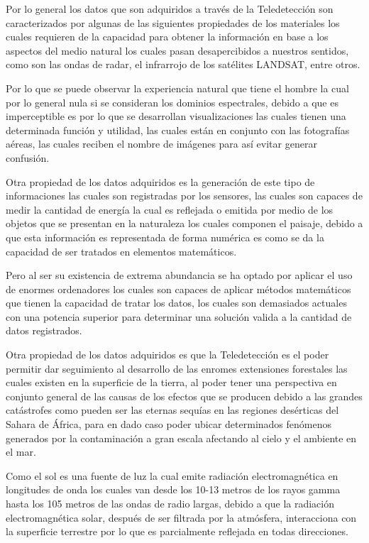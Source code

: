 Por lo general los datos que son adquiridos a través de la Teledetección son caracterizados por algunas de las siguientes propiedades de los materiales los cuales requieren de la capacidad para obtener la información en base a los aspectos del medio natural los cuales pasan desapercibidos a nuestros sentidos, como son las ondas de radar, el infrarrojo de los satélites LANDSAT, entre otros.


Por lo que se puede observar la experiencia natural que tiene el hombre la cual por lo general nula si se consideran los dominios espectrales, debido a que es imperceptible es por lo que se desarrollan visualizaciones las cuales tienen una determinada función y utilidad, las cuales están en conjunto con las fotografías aéreas, las cuales reciben el nombre de imágenes para así evitar generar confusión.

Otra propiedad de los datos adquiridos es la generación de este tipo de informaciones las cuales son registradas por los sensores, las cuales son capaces de medir la cantidad de energía la cual es reflejada o emitida por medio de los objetos que se presentan en la naturaleza los cuales componen el paisaje, debido a que esta información es representada de forma numérica es como se da la capacidad de ser tratados en elementos matemáticos. 

Pero al ser su existencia de extrema abundancia se ha optado por aplicar el uso de enormes ordenadores los cuales son capaces de aplicar métodos matemáticos que tienen la capacidad de tratar los datos, los cuales son demasiados actuales con una potencia superior para determinar una solución valida a la cantidad de datos registrados.

Otra propiedad de los datos adquiridos es que la Teledetección es el poder permitir dar seguimiento al desarrollo de las enromes extensiones forestales las cuales existen en la superficie de la tierra, al poder tener una perspectiva en conjunto general de las causas de los efectos que se producen debido a las grandes catástrofes como pueden ser las eternas sequías en las regiones desérticas del Sahara de África, para en dado caso poder ubicar determinados fenómenos generados por la contaminación a gran escala afectando al cielo y el ambiente en el mar.

Como el sol es una fuente de luz la cual emite radiación electromagnética en longitudes de onda los cuales van desde los 10-13 metros de los rayos gamma hasta los 105 metros de las ondas de radio largas, debido a que la radiación electromagnética solar, después de ser filtrada por la atmósfera, interacciona con la superficie terrestre por lo que es parcialmente reflejada en todas direcciones. \cite{MartiCardona2011}

